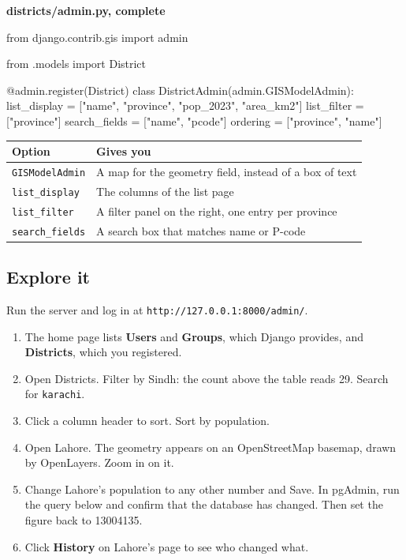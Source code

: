 \documentclass{article}
\newcommand{\cd}[1]{\texttt{#1}}
\newcommand{\cdb}[1]{\nolinkurl{#1}}
\newcommand{\codecap}[1]{%
  \par\vspace{.9em}\noindent\textbf{#1}\par\vspace{-.6em}}
\begin{document}
\codecap{districts/admin.py, complete}
\begin{code}
from django.contrib.gis import admin

from .models import District


@admin.register(District)
class DistrictAdmin(admin.GISModelAdmin):
    list_display = ["name", "province", "pop_2023", "area_km2"]
    list_filter = ["province"]
    search_fields = ["name", "pcode"]
    ordering = ["province", "name"]
\end{code}

\begin{tabularx}{\textwidth}{@{}L{3.6cm} X@{}}
\toprule
\textbf{Option} & \textbf{Gives you} \\
\midrule
\cd{GISModelAdmin}   & A map for the geometry field, instead of a box of
                       text \\
\cd{list\_display}   & The columns of the list page \\
\cd{list\_filter}    & A filter panel on the right, one entry per
                       province \\
\cd{search\_fields}  & A search box that matches name or P-code \\
\bottomrule
\end{tabularx}

\subsection{Explore it}

Run the server and log in at \cdb{http://127.0.0.1:8000/admin/}.

\begin{enumerate}
  \item The home page lists \textbf{Users} and \textbf{Groups}, which
        Django provides, and \textbf{Districts}, which you registered.
  \item Open Districts. Filter by Sindh: the count above the table reads
        29. Search for \cd{karachi}.
  \item Click a column header to sort. Sort by population.
  \item Open Lahore. The geometry appears on an OpenStreetMap basemap,
        drawn by OpenLayers. Zoom in on it.
  \item Change Lahore's population to any other number and Save. In
        pgAdmin, run the query below and confirm that the database has
        changed. Then set the figure back to 13004135.
  \item Click \textbf{History} on Lahore's page to see who changed what.
\end{enumerate}
\end{document}
